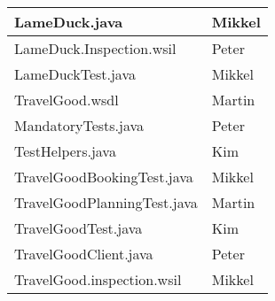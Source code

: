 \begin{tabular}{|l|l|}
\hline LameDuck.java & Mikkel \\ 
\hline LameDuck.Inspection.wsil & Peter \\ 
\hline LameDuckTest.java & Mikkel \\
\hline TravelGood.wsdl & Martin \\ 
\hline MandatoryTests.java & Peter \\  
\hline TestHelpers.java & Kim \\ 
\hline TravelGoodBookingTest.java & Mikkel \\ 
\hline TravelGoodPlanningTest.java & Martin \\ 
\hline TravelGoodTest.java & Kim \\ 
\hline TravelGoodClient.java & Peter \\ 
\hline TravelGood.inspection.wsil & Mikkel  \\ 
\hline 
\end{tabular} 